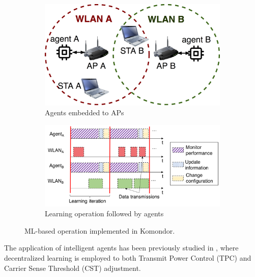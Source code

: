 \documentclass[conference]{IEEEtran}
\begin{document}
	\begin{figure}[h]
		\centering
		\begin{subfigure}[b]{0.6\columnwidth}			\includegraphics[width=\textwidth]{wlan_agents.png}
			\caption{Agents embedded to APs}
			\label{fig:wlan_agents}
		\end{subfigure}
		\begin{subfigure}[b]{1\columnwidth}
			\includegraphics[width=\textwidth]{agents_operation.png}
			\caption{Learning operation followed by agents}
			\label{fig:agents_operation}
		\end{subfigure}
		\caption{ML-based operation implemented in Komondor.}
		\label{fig:agents_komondor}
	\end{figure}
	
	The application of intelligent agents has been previously studied in \cite{wilhelmi2017collaborative, wilhelmi2018potential}, where decentralized learning is employed to both Transmit Power Control (TPC) and Carrier Sense Threshold (CST) adjustment.
	
\end{document}

